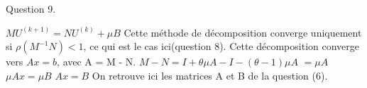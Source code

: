 \documentclass[a4paper,11pt]{article}
\theoremstyle{nonumberplain}
\theoremstyle{nonumberplain}
\theoremstyle{nonumberplain}
\begin{document}
    Question 9.

    $M U^{(k+1)} = NU^{(k)} + \mu B$
    Cette méthode de décomposition converge uniquement si $\rho(M^{-1}N) < 1$, ce qui est le cas ici(question 8).
    \newline
    Cette décomposition converge vers $Ax = b$, avec A = M - N.
    \newline
    $M - N = I + \theta \mu A - I - (\theta - 1) \mu A$
    $ = \mu A $
    \newline
    $\mu A x = \mu B$
    $A x = B$
    On retrouve ici les matrices A et B de la question (6).
\end{document}
